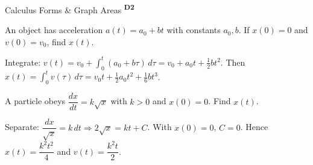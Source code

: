 ﻿\documentclass[12pt,a4paper]{article}
\providecommand{\KPProblems}{}
\newcommand{\DTwo}{\texorpdfstring{\textsuperscript{\textbf{D2}}}{ D2}}
\begin{document}
\begin{KnowledgePoint}{Calculus Forms \& Graph Areas \DTwo}
  \KPProblems
  \begin{cheatproblem}
  An object has acceleration $a(t)=a_0+bt$ with constants $a_0,b$. If $x(0)=0$ and $v(0)=v_0$, find $x(t)$.
  \begin{solutionbox}
  Integrate: $v(t)=v_0+\int_0^t(a_0+b\tau)\,d\tau=v_0+a_0 t+\tfrac12 b t^2$. Then $x(t)=\int_0^t v(\tau)\,d\tau=v_0 t+\tfrac12 a_0 t^2+\tfrac16 b t^3$.
  \end{solutionbox}
  \end{cheatproblem}

  \begin{cheatproblem}
  A particle obeys $\dfrac{dx}{dt}=k\sqrt{x}$ with $k>0$ and $x(0)=0$. Find $x(t)$.
  \begin{solutionbox}
  Separate: $\dfrac{dx}{\sqrt{x}}=k\,dt\Rightarrow 2\sqrt{x}=kt+C$. With $x(0)=0$, $C=0$. Hence $x(t)=\dfrac{k^2 t^2}{4}$ and $v(t)=\dfrac{k^2 t}{2}$.
  \end{solutionbox}
  \end{cheatproblem}
\end{KnowledgePoint}


\end{document}

